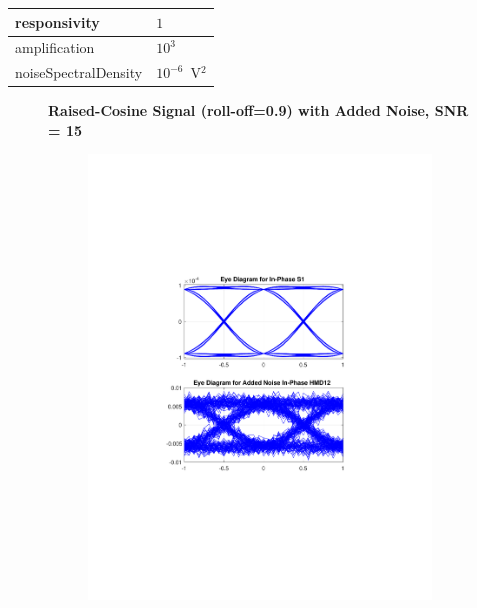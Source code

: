 \begin{refsection}
\begin{table}[H]
\begin{tabular}{|l|l|}
		responsivity           & $1$                                                        \\ \hline
		amplification          & $10^3$                                                     \\ \hline
		noiseSpectralDensity   & $10^{-6}$~V$^2$                             					\\ \hline
	\end{tabular}
\end{table}
\begin{figure}[H]
		\centering
	\textbf{Raised-Cosine Signal (roll-off=0.9) with Added Noise, SNR = 15}
	\begin{minipage}{\linewidth}
		\centering
	\begin{subfigure}{.45\textwidth}
		\centering
		\includegraphics[clip, trim=5cm 7cm 5cm 7cm, width=\textwidth]{./sdf/m_qam_system/figures/eyes/if_n_nmf_45_60_rc_09.pdf}

\end{subfigure}
\end{minipage}
\end{figure}
\end{refsection}
